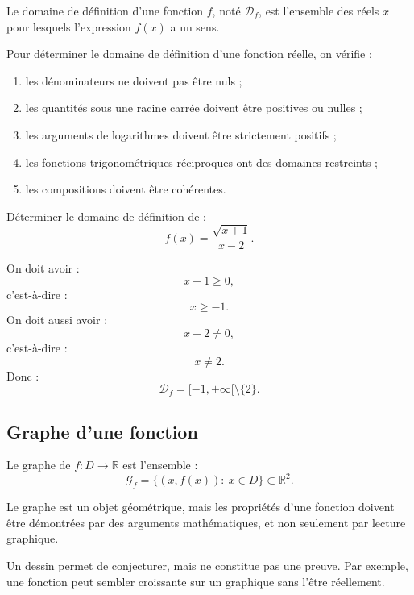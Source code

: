 \documentclass[11pt,a4paper]{article}
\newcommand{\R}{\mathbb R}
\newcommand{\Df}{\mathcal D_f}
\begin{document}
\begin{definitionbox}
Le domaine de définition d'une fonction \(f\), noté \(\Df\), est l'ensemble des réels \(x\) pour lesquels l'expression \(f(x)\) a un sens.
\end{definitionbox}

\begin{methodbox}
Pour déterminer le domaine de définition d'une fonction réelle, on vérifie :
\begin{enumerate}
    \item les dénominateurs ne doivent pas être nuls ;
    \item les quantités sous une racine carrée doivent être positives ou nulles ;
    \item les arguments de logarithmes doivent être strictement positifs ;
    \item les fonctions trigonométriques réciproques ont des domaines restreints ;
    \item les compositions doivent être cohérentes.
\end{enumerate}
\end{methodbox}

\begin{exercicebox}
Déterminer le domaine de définition de :
\[
f(x)=\frac{\sqrt{x+1}}{x-2}.
\]
\end{exercicebox}

\begin{correctionbox}
On doit avoir :
\[
x+1\geq 0,
\]
c'est-à-dire :
\[
x\geq -1.
\]
On doit aussi avoir :
\[
x-2\neq0,
\]
c'est-à-dire :
\[
x\neq2.
\]
Donc :
\[
\Df=[-1,+\infty[\setminus\{2\}.
\]
\end{correctionbox}

\subsection{Graphe d'une fonction}

\begin{definitionbox}[Graphe]
Le graphe de \(f:D\to\R\) est l'ensemble :
\[
\mathcal G_f=\{(x,f(x)):\ x\in D\}\subset\R^2.
\]
\end{definitionbox}

Le graphe est un objet géométrique, mais les propriétés d'une fonction doivent être démontrées par des arguments mathématiques, et non seulement par lecture graphique.

\begin{erreurbox}
Un dessin permet de conjecturer, mais ne constitue pas une preuve.  
Par exemple, une fonction peut sembler croissante sur un graphique sans l'être réellement.
\end{erreurbox}
\end{document}
